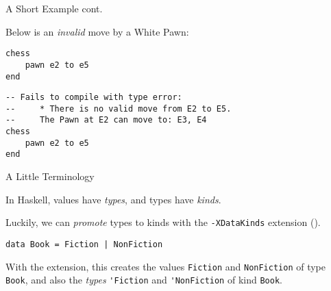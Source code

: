 \documentclass{beamer}
\newcommand{\inline}[1]{\lstinline[basicstyle=\ttfamily]{#1}}
\begin{document}
\begin{frame}[fragile]{A Short Example cont.}

Below is an \emph{invalid} move by a White Pawn:

\begin{figure}[h]
    \centering
    \newgame
    \scalebox{0.55}{\showboard}
    \quad
    \scalebox{0.55}{\showboard}
    \label{badpawnmove}
\end{figure}

\pause

\begin{overprint}

\begin{lstlisting}
chess
    pawn e2 to e5
end
\end{lstlisting}

\begin{lstlisting}
-- Fails to compile with type error:
--     * There is no valid move from E2 to E5.
--     The Pawn at E2 can move to: E3, E4
chess
    pawn e2 to e5
end
\end{lstlisting}

\end{overprint}

\end{frame}

\begin{frame}[fragile]{A Little Terminology}

In Haskell, values have \emph{types}, and types have \emph{kinds}.

\pause

Luckily, we can \emph{promote} types to kinds with the \inline{-XDataKinds} extension (\cite{givingpromotion}).

\pause

\begin{lstlisting}
data Book = Fiction | NonFiction
\end{lstlisting}

With the extension, this creates the values \inline{Fiction} and \inline{NonFiction} of type \inline{Book}, and also the \emph{types} \inline{'Fiction} and \inline{'NonFiction} of kind \inline{Book}.

\end{frame}
\end{document}
